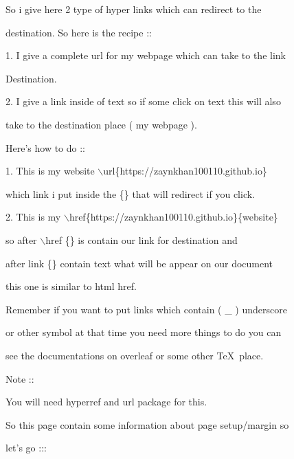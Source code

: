 \documentclass[11pt]{article}
\begin{document}
\vspace{1cm}

So i give here 2 type of hyper links which can redirect to the

destination. So here is the recipe ::

1. I give a complete url for my webpage which can take to the link

Destination.

2. I give a link inside of text so if some click on text this will also

take to the destination place ( my webpage ).


Here's how to do ::

\vspace{1cm}

1. This is my website $\backslash$url\{https://zaynkhan100110.github.io\}

\vspace{1cm}

which link i put inside the \{\} that will redirect if you click.

\vspace{1cm}

2. This is my $\backslash$href\{https://zaynkhan100110.github.io\}\{website\}

\vspace{1cm}

so after $\backslash$href \{\} is contain our link for destination and

after link \{\} contain text what will be appear on our document

this one is similar to html href.

\vspace{1cm}

Remember if you want to put links which contain ( \_ ) underscore

or other symbol at that time you need more things to do you can

 see the documentations on overleaf or some other \TeX\ place.

\vspace{1cm}

Note ::

You will need hyperref and url package for this.

\pagebreak

{\large So this page contain some information about page setup/margin so 

let's go ::: }

\vspace{0.5cm}
\end{document}

